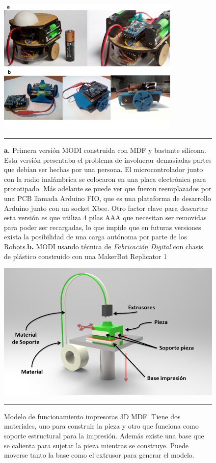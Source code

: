 \begin{figure}[htbp]
	\centering
		\includegraphics[width=0.8\textwidth]{./Pictures/modi_analogToDigital.png}
		\rule{35em}{0.5pt}
	\caption[Comparación de construcción análoga y digital]{\textbf{a.} Primera versión MODI construida con MDF y bastante silicona. Esta versión presentaba el problema de involucrar demasiadas partes que debían ser hechas por una persona. El microcontrolador junto con la radio inalámbrica se colocaron en una placa electrónica para prototipado. Más adelante se puede ver que fueron reemplazados por una PCB llamada Arduino FIO, que es una plataforma de desarrollo Arduino junto con un socket Xbee. Otro factor clave para descartar esta versión es que utiliza 4 pilas AAA que necesitan ser removidas para poder ser recargadas, lo que impide que en futuras versiones exista la posibilidad de una carga autónoma por parte de los Robots.\textbf{b.} MODI usando técnica de \emph{ Fabricación Digital }con chasis de plástico construido con una MakerBot Replicator 1}
	\label{fig:analgTodigital}
\end{figure}

\begin{figure}[htbp]
	\centering
		\includegraphics[width=\textwidth]{./Figures/3Dprint.png}
		\rule{35em}{0.5pt}
	\caption[Modelo funcionamiento Impresora 3D]{Modelo de funcionamiento impresoras 3D MDF. Tiene dos materiales, uno para construir la pieza y otro que funciona como soporte estructural para la impresión. Además existe una base que se calienta para sujetar la pieza mientras se construye. Puede moverse tanto la base como el extrusor para generar el modelo.}
	\label{fig:3Dprint}
\end{figure}	



